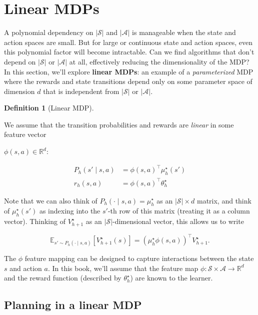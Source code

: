 \documentclass[
  letterpaper,
  DIV=11,
  numbers=noendperiod]{scrreprt}
\theoremstyle{plain}
\theoremstyle{plain}
\theoremstyle{definition}
\theoremstyle{definition}
\newtheorem{definition}{Definition}[chapter]
\theoremstyle{remark}
\begin{document}
\section{Linear MDPs}\label{linear-mdps}

A polynomial dependency on \(|\mathcal{S}|\) and \(|\mathcal{A}|\) is
manageable when the state and action spaces are small. But for large or
continuous state and action spaces, even this polynomial factor will
become intractable. Can we find algorithms that don't depend on
\(|\mathcal{S}|\) or \(|\mathcal{A}|\) at all, effectively reducing the
dimensionality of the MDP? In this section, we'll explore \textbf{linear
MDPs}: an example of a \emph{parameterized} MDP where the rewards and
state transitions depend only on some parameter space of dimension \(d\)
that is independent from \(|\mathcal{S}|\) or \(|\mathcal{A}|\).

\begin{definition}[Linear
MDP]\protect\hypertarget{def-linear_mdp}{}\label{def-linear_mdp}

We assume that the transition probabilities and rewards are
\emph{linear} in some feature vector

\(\phi(s, a) \in \mathbb{R}^d\):

\[\begin{aligned}
        P_h(s' \mid s, a) & = \phi(s, a)^\top \mu^\star_h(s') \\
        r_h(s, a)         & = \phi(s, a)^\top \theta_h^\star
\end{aligned}\]

Note that we can also think of \(P_h(\cdot \mid s, a) = \mu_h^\star\) as
an \(|\mathcal{S}| \times d\) matrix, and think of \(\mu^\star_h(s')\)
as indexing into the \(s'\)-th row of this matrix (treating it as a
column vector). Thinking of \(V^\star_{h+1}\) as an
\(|\mathcal{S}|\)-dimensional vector, this allows us to write

\[\mathbb{E}_{s' \sim P_h(\cdot \mid s, a)}[V^\star_{h+1}(s)] = (\mu^\star_h\phi(s, a))^\top V^\star_{h+1}.\]

The \(\phi\) feature mapping can be designed to capture interactions
between the state \(s\) and action \(a\). In this book, we'll assume
that the feature map
\(\phi : \mathcal{S} \times \mathcal{A} \to \mathbb{R}^d\) and the
reward function (described by \(\theta_h^\star\)) are known to the
learner.

\end{definition}

\subsection{Planning in a linear MDP}\label{planning-in-a-linear-mdp}
\end{document}
